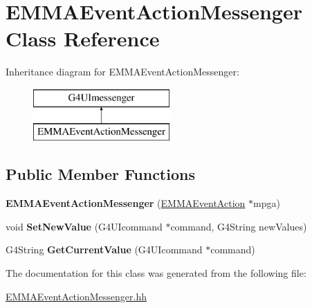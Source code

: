 \hypertarget{classEMMAEventActionMessenger}{\section{E\-M\-M\-A\-Event\-Action\-Messenger Class Reference}
\label{classEMMAEventActionMessenger}
}
Inheritance diagram for E\-M\-M\-A\-Event\-Action\-Messenger\-:\begin{figure}[H]
\begin{center}
\leavevmode
\includegraphics[height=2.000000cm]{classEMMAEventActionMessenger}
\end{center}
\end{figure}
\subsection*{Public Member Functions}
\begin{DoxyCompactItemize}
\item 
\hypertarget{classEMMAEventActionMessenger_a15752ef9f2005737faac8f5f4729ddee}{{\bfseries E\-M\-M\-A\-Event\-Action\-Messenger} (\hyperlink{classEMMAEventAction}{E\-M\-M\-A\-Event\-Action} $\ast$mpga)}\label{classEMMAEventActionMessenger_a15752ef9f2005737faac8f5f4729ddee}

\item 
\hypertarget{classEMMAEventActionMessenger_a3c884dc415a8ed1d3dbd314777aeff6e}{void {\bfseries Set\-New\-Value} (G4\-U\-Icommand $\ast$command, G4\-String new\-Values)}\label{classEMMAEventActionMessenger_a3c884dc415a8ed1d3dbd314777aeff6e}

\item 
\hypertarget{classEMMAEventActionMessenger_a9125be2d8f26d54965937881211434e3}{G4\-String {\bfseries Get\-Current\-Value} (G4\-U\-Icommand $\ast$command)}\label{classEMMAEventActionMessenger_a9125be2d8f26d54965937881211434e3}

\end{DoxyCompactItemize}


The documentation for this class was generated from the following file\-:\begin{DoxyCompactItemize}
\item 
\hyperlink{EMMAEventActionMessenger_8hh}{E\-M\-M\-A\-Event\-Action\-Messenger.\-hh}\end{DoxyCompactItemize}
